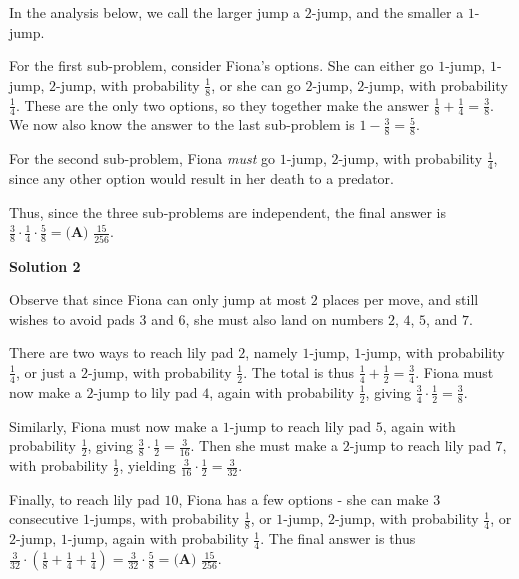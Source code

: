 \begin{enumerate}
 In the analysis below, we call the larger jump a $2$-jump, and the smaller a $1$-jump. 

 For the first sub-problem, consider Fiona's options. She can either go $1$-jump, $1$-jump, $2$-jump, with probability $\frac{1}{8}$, or she can go $2$-jump, $2$-jump, with probability $\frac{1}{4}$. These are the only two options, so they together make the answer $\frac{1}{8}+\frac{1}{4}=\frac{3}{8}$. We now also know the answer to the last sub-problem is $1-\frac{3}{8}=\frac{5}{8}$.

 For the second sub-problem, Fiona \textit{must} go $1$-jump, $2$-jump, with probability $\frac{1}{4}$, since any other option would result in her death to a predator.

 Thus, since the three sub-problems are independent, the final answer is $\frac{3}{8} \cdot \frac{1}{4} \cdot \frac{5}{8} = \boxed{\textbf{(A) }\frac{15}{256}}$.

 



\textbf{Solution 2}

Observe that since Fiona can only jump at most $2$ places per move, and still wishes to avoid pads $3$ and $6$, she must also land on numbers $2$, $4$, $5$, and $7$.

 There are two ways to reach lily pad $2$, namely $1$-jump, $1$-jump, with probability $\frac{1}{4}$, or just a $2$-jump, with probability $\frac{1}{2}$. The total is thus $\frac{1}{4} + \frac{1}{2} = \frac{3}{4}$. Fiona must now make a $2$-jump to lily pad $4$, again with probability $\frac{1}{2}$, giving $\frac{3}{4} \cdot \frac{1}{2} = \frac{3}{8}$.

 Similarly, Fiona must now make a $1$-jump to reach lily pad $5$, again with probability $\frac{1}{2}$, giving $\frac{3}{8} \cdot \frac{1}{2} = \frac{3}{16}$. Then she must make a $2$-jump to reach lily pad $7$, with probability $\frac{1}{2}$, yielding $\frac{3}{16} \cdot \frac{1}{2} = \frac{3}{32}$.

 Finally, to reach lily pad $10$, Fiona has a few options - she can make $3$ consecutive $1$-jumps, with probability $\frac{1}{8}$, or $1$-jump, $2$-jump, with probability $\frac{1}{4}$, or $2$-jump, $1$-jump, again with probability $\frac{1}{4}$. The final answer is thus $\frac{3}{32} \cdot \left(\frac{1}{8} + \frac{1}{4} + \frac{1}{4}\right) = \frac{3}{32} \cdot \frac{5}{8} = \boxed{\textbf{(A) } \frac{15}{256}}$.

 




\end{enumerate}
